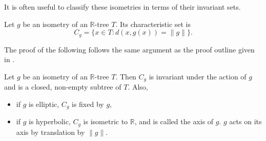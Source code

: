 It is often useful to classify these isometries in terms of their invariant sets.
\begin{definition}
    Let $g$ be an isometry of an $\mathbb{R}$-tree $T$. Its \textnormal{characteristic set} is \[C_g = \{x\in T:d(x,g(x))=\lVert g \rVert\}.\]
\end{definition}
The proof of the following follows the same argument as the proof outline given in \cite{CullerMorgan}.
\begin{proposition}
    Let $g$ be an isometry of an $\mathbb{R}$-tree $T$. Then $C_g$ is invariant under the action of $g$ and is a closed, non-empty subtree of $T$. Also,
    \begin{itemize}
        \item if $g$ is elliptic, $C_g$ is fixed by $g$,
        \item if $g$ is hyperbolic, $C_g$ is isometric to $\mathbb{R}$, and is called the \textnormal{axis} of $g$. $g$ acts on its axis by translation by $\lVert g\rVert$.
    \end{itemize}
\end{proposition}
